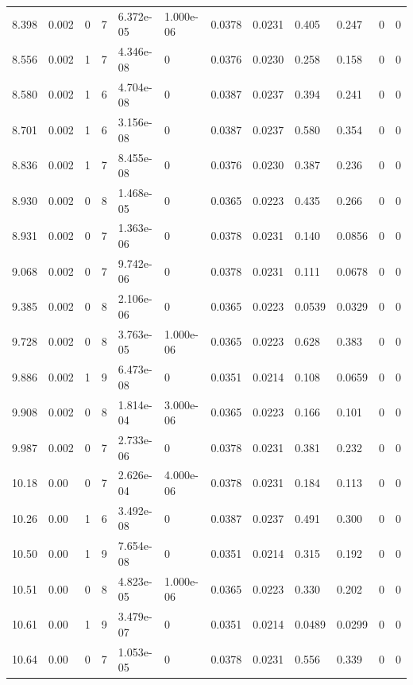 \documentclass[preview]{standalone}
\begin{document}
{{{\begin{tabular}{L{1.2cm}C{1.2cm} C{0.3cm}C{0.5cm} C{1.4cm}C{1.4cm} C{1.4cm}C{1.4cm} C{1.6cm}C{1.6cm} C{1.6cm}C{1.6cm}}
  8.398  &  0.002  & 0     &  7 &  6.372e-05  & 1.000e-06  &  0.0378&   0.0231& 0.405 & 0.247   &  0 & 0  \\ 
  8.556  &  0.002  & 1     &  7 &  4.346e-08  & 0  &  0.0376&   0.0230& 0.258 & 0.158   &  0 & 0  \\ 
  8.580  &  0.002  & 1     &  6 &  4.704e-08  & 0  &  0.0387&   0.0237& 0.394 & 0.241   &  0 & 0  \\ 
  8.701  &  0.002  & 1     &  6 &  3.156e-08  & 0  &  0.0387&   0.0237& 0.580 & 0.354   &  0 & 0  \\ 
  8.836  &  0.002  & 1     &  7 &  8.455e-08  & 0  &  0.0376&   0.0230& 0.387 & 0.236   &  0 & 0  \\ 
  8.930  &  0.002  & 0     &  8 &  1.468e-05  & 0  &  0.0365&   0.0223& 0.435 & 0.266   &  0 & 0  \\ 
  8.931  &  0.002  & 0     &  7 &  1.363e-06  & 0  &  0.0378&   0.0231& 0.140 & 0.0856   &  0 & 0  \\ 
  9.068  &  0.002  & 0     &  7 &  9.742e-06  & 0  &  0.0378&   0.0231& 0.111 & 0.0678   &  0 & 0  \\ 
  9.385  &  0.002  & 0     &  8 &  2.106e-06  & 0  &  0.0365&   0.0223& 0.0539 & 0.0329   &  0 & 0  \\ 
  9.728  &  0.002  & 0     &  8 &  3.763e-05  & 1.000e-06  &  0.0365&   0.0223& 0.628 & 0.383   &  0 & 0  \\ 
  9.886  &  0.002  & 1     &  9 &  6.473e-08  & 0  &  0.0351&   0.0214& 0.108 & 0.0659   &  0 & 0  \\ 
  9.908  &  0.002  & 0     &  8 &  1.814e-04  & 3.000e-06  &  0.0365&   0.0223& 0.166 & 0.101   &  0 & 0  \\ 
  9.987  &  0.002  & 0     &  7 &  2.733e-06  & 0  &  0.0378&   0.0231& 0.381 & 0.232   &  0 & 0  \\ 
  10.18  &  0.00  & 0     &  7 &  2.626e-04  & 4.000e-06  &  0.0378&   0.0231& 0.184 & 0.113   &  0 & 0  \\ 
  10.26  &  0.00  & 1     &  6 &  3.492e-08  & 0  &  0.0387&   0.0237& 0.491 & 0.300   &  0 & 0  \\ 
  10.50  &  0.00  & 1     &  9 &  7.654e-08  & 0  &  0.0351&   0.0214& 0.315 & 0.192   &  0 & 0  \\ 
  10.51  &  0.00  & 0     &  8 &  4.823e-05  & 1.000e-06  &  0.0365&   0.0223& 0.330 & 0.202   &  0 & 0  \\ 
  10.61  &  0.00  & 1     &  9 &  3.479e-07  & 0  &  0.0351&   0.0214& 0.0489 & 0.0299   &  0 & 0  \\ 
  10.64  &  0.00  & 0     &  7 &  1.053e-05  & 0  &  0.0378&   0.0231& 0.556 & 0.339   &  0 & 0  \\ 

\end{tabular}}}}
\end{document}
